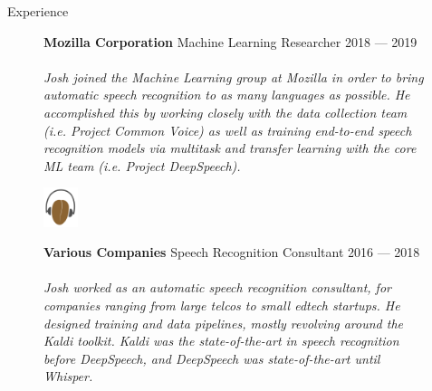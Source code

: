 \documentclass{resume} %
\begin{document}
\begin{rSection}{Experience}
  \begin{figure}[H]
    \begin{minipage}{0.2\textwidth}
      \centering
      
    \end{minipage}
    \begin{minipage}{0.8\textwidth}
      {\bf Mozilla Corporation} \hfill Machine Learning Researcher \hspace{0.5cm} {2018 --- 2019} \\ \\
      \textit{Josh joined the Machine Learning group at Mozilla in order to bring automatic speech recognition to as many languages as possible. He accomplished this by working closely with the data collection team (i.e. Project Common Voice) as well as training end-to-end speech recognition models via multitask and transfer learning with the core ML team (i.e. Project DeepSpeech).} \\
    \end{minipage}
  \end{figure}

  \begin{figure}[H]
    \begin{minipage}{0.2\textwidth}
      \centering
      \includegraphics[width=1cm]{imgs/kaldi-logo.png}
    \end{minipage}
    \begin{minipage}{0.8\textwidth}
      {\bf Various Companies} \hfill Speech Recognition Consultant \hspace{0.5cm} {2016 --- 2018} \\ \\
      \textit{Josh worked as an automatic speech recognition consultant, for companies ranging from large telcos to small edtech startups. He designed training and data pipelines, mostly revolving around the Kaldi toolkit. Kaldi was the state-of-the-art in speech recognition before DeepSpeech, and DeepSpeech was state-of-the-art until Whisper.} \\
    \end{minipage}
  \end{figure}


\end{rSection}
\end{document}
